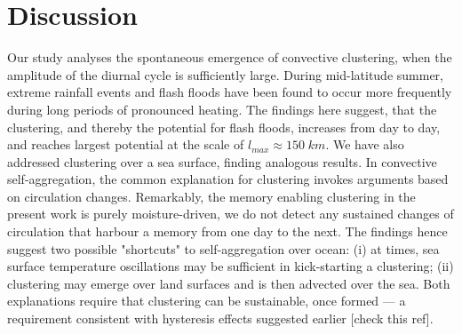 \documentclass[draft,linenumbers]{agujournal2019}
\begin{document}
\section{Discussion}\label{sec:discussions}
Our study analyses the spontaneous emergence of convective clustering, when the amplitude of the diurnal cycle is sufficiently large. 
During mid-latitude summer, extreme rainfall events and flash floods have been found to occur more frequently during long periods of pronounced heating. 
The findings here suggest, that the clustering, and thereby the potential for flash floods, increases from day to day, and reaches largest potential at the scale of $l_{max}\approx 150\;km$.
We have also addressed clustering over a sea surface, finding analogous results. 
In convective self-aggregation, the common explanation for clustering invokes arguments based on circulation changes.
Remarkably, the memory enabling clustering in the present work is purely moisture-driven, we do not detect any sustained changes of circulation that harbour a memory from one day to the next.
The findings hence suggest two possible "shortcuts" to self-aggregation over ocean: 
(i) at times, sea surface temperature oscillations may be sufficient in kick-starting a clustering;
(ii) clustering may emerge over land surfaces and is then advected over the sea.
Both explanations require that clustering can be sustainable, once formed --- a requirement consistent with hysteresis effects suggested earlier \cite{muller2015favors} [check this ref].


\newpage
\clearpage
\end{document}
